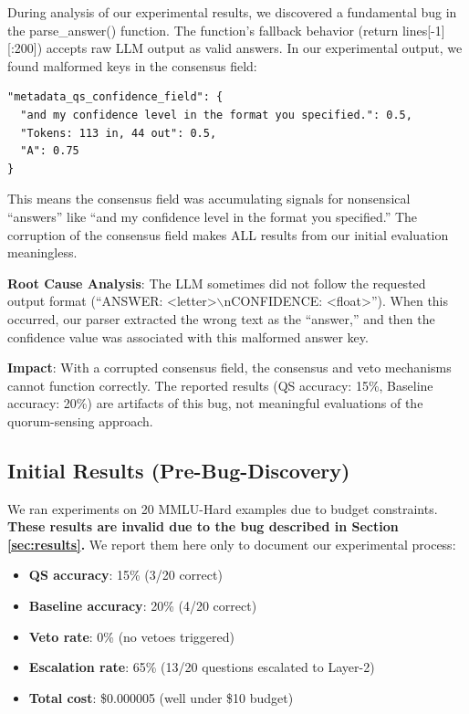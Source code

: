 \documentclass[11pt,letterpaper]{article}
\begin{document}
During analysis of our experimental results, we discovered a fundamental bug in the parse\_answer() function. The function's fallback behavior (return lines[-1][:200]) accepts raw LLM output as valid answers. In our experimental output, we found malformed keys in the consensus field:

\begin{verbatim}
"metadata_qs_confidence_field": {
  "and my confidence level in the format you specified.": 0.5,
  "Tokens: 113 in, 44 out": 0.5,
  "A": 0.75
}
\end{verbatim}

This means the consensus field was accumulating signals for nonsensical ``answers'' like ``and my confidence level in the format you specified.'' The corruption of the consensus field makes ALL results from our initial evaluation meaningless.

\textbf{Root Cause Analysis}: The LLM sometimes did not follow the requested output format (``ANSWER: <letter>$\backslash$nCONFIDENCE: <float>''). When this occurred, our parser extracted the wrong text as the ``answer,'' and then the confidence value was associated with this malformed answer key.

\textbf{Impact}: With a corrupted consensus field, the consensus and veto mechanisms cannot function correctly. The reported results (QS accuracy: 15\%, Baseline accuracy: 20\%) are artifacts of this bug, not meaningful evaluations of the quorum-sensing approach.

\subsection{Initial Results (Pre-Bug-Discovery)}

We ran experiments on 20 MMLU-Hard examples due to budget constraints. \textbf{These results are invalid due to the bug described in Section \ref{sec:results}.} We report them here only to document our experimental process:

\begin{itemize}
\item \textbf{QS accuracy}: 15\% (3/20 correct)
\item \textbf{Baseline accuracy}: 20\% (4/20 correct)
\item \textbf{Veto rate}: 0\% (no vetoes triggered)
\item \textbf{Escalation rate}: 65\% (13/20 questions escalated to Layer-2)
\item \textbf{Total cost}: \$0.000005 (well under \$10 budget)
\end{itemize}
\end{document}
